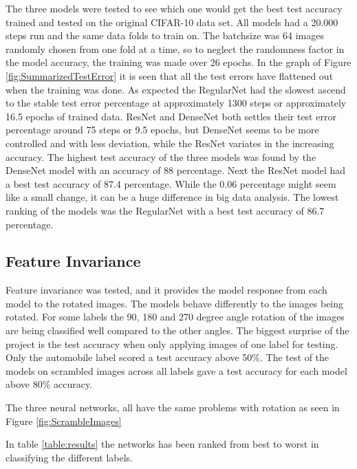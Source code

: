 The three models were tested to see which one would get the best test accuracy trained and tested on the original CIFAR-10 data set. All models had a 20.000 steps run and the same data folds to train on. The batchsize was 64 images randomly chosen from one fold at a time, so to neglect the randomness factor in the model accuracy, the training was made over 26 epochs. In the graph of Figure \ref{fig:SummarizedTestError} it is seen that all the test errors have flattened out when the training was done. As expected the RegularNet had the slowest ascend to the stable test error percentage at approximately 1300 steps or approximately 16.5 epochs of trained data. ResNet and DenseNet both settles their test error percentage around 75 steps or 9.5 epochs, but DenseNet seems to be more controlled and with less deviation, while the ResNet variates in the increasing accuracy. The highest test accuracy of the three models was found by the DenseNet model with an accuracy of 88 percentage. Next the ResNet model had a best test accuracy of 87.4 percentage. While the 0.06 percentage might seem like a small change, it can be a huge difference in big data analysis. The lowest ranking of the models was the RegularNet with a best test accuracy of 86.7 percentage.

\subsection{Feature Invariance}

Feature invariance was tested, and it provides the model response from each model to the rotated images. The models behave differently to the images being rotated. For some labels the 90, 180 and 270 degree angle rotation of the images are being classified well compared to the other angles. The biggest surprise of the project is the test accuracy when only applying images of one label for testing. Only the automobile label scored a test accuracy above 50\%. The test of the models on scrambled images across all labels gave a test accuracy for each model above 80\% accuracy.

The three neural networks, all have the same problems with rotation as seen in Figure \ref{fig:ScrambleImages} 

\FloatBarrier

In table \ref{table:results} the networks has been ranked from best to worst in classifying the different labels. 

